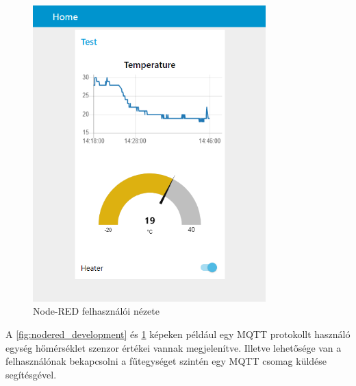\begin{figure}[t!]
    \centering
    \includegraphics[width=90mm, keepaspectratio]{figures/nodered-ui.png}
    \caption{Node-RED felhasználói nézete}
    \label{fig:nodered_ui}
\end{figure}

A \ref{fig:nodered_development} és \ref{fig:nodered_ui} képeken például egy MQTT protokollt használó egység hőmérséklet szenzor értékei vannak megjelenítve. Illetve lehetősége van a felhasználónak bekapcsolni a fűtegységet szintén egy MQTT csomag küldése segítésgével.

